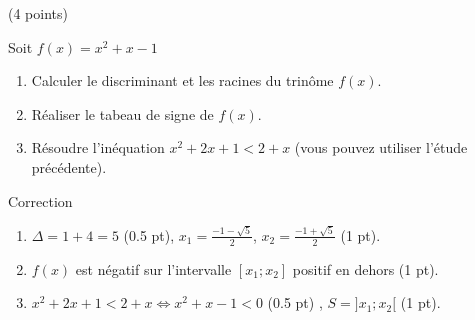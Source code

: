 \documentclass[a4paper,11pt]{article}
\theoremstyle{break}
\begin{document}
\begin{exo}(4 points)
      
 Soit $f(x)=x^2+x-1$     
\begin{enumerate}
 \item Calculer le discriminant et les racines du trinôme $f(x)$.
 \item Réaliser le tabeau de signe de $f(x)$.
 \item Résoudre l'inéquation $x^2+2 x+1<2+x$ (vous pouvez utiliser l'étude précédente).
\end{enumerate}



\begin{correction}
Correction
\begin{enumerate}
 \item $\Delta=1+4=5$ (0.5 pt), $x_1=\frac{-1-\sqrt{5}}{2}$, $x_2=\frac{-1+\sqrt{5}}{2}$ (1 pt).
 \item $f(x)$ est n\'egatif sur l'intervalle $[x_1;x_2]$ positif en dehors (1 pt).
 \item $x^2+2 x+1<2+x \Leftrightarrow x^2+x-1 <0$ (0.5 pt) , $S=]x_1;x_2[$ (1 pt).

\end{enumerate}

\end{correction}

\end{exo}
~
   
\end{document}
